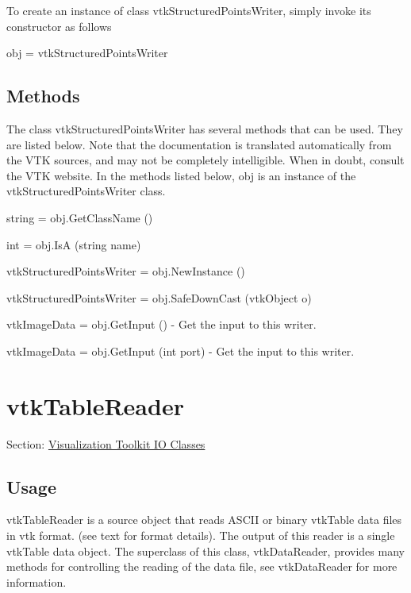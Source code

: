 To create an instance of class vtk\-Structured\-Points\-Writer, simply invoke its constructor as follows \begin{DoxyVerb}  obj = vtkStructuredPointsWriter
\end{DoxyVerb}
 \hypertarget{vtkwidgets_vtkxyplotwidget_Methods}{}\subsection{Methods}\label{vtkwidgets_vtkxyplotwidget_Methods}
The class vtk\-Structured\-Points\-Writer has several methods that can be used. They are listed below. Note that the documentation is translated automatically from the V\-T\-K sources, and may not be completely intelligible. When in doubt, consult the V\-T\-K website. In the methods listed below, {\ttfamily obj} is an instance of the vtk\-Structured\-Points\-Writer class. 
\begin{DoxyItemize}
\item {\ttfamily string = obj.\-Get\-Class\-Name ()}  
\item {\ttfamily int = obj.\-Is\-A (string name)}  
\item {\ttfamily vtk\-Structured\-Points\-Writer = obj.\-New\-Instance ()}  
\item {\ttfamily vtk\-Structured\-Points\-Writer = obj.\-Safe\-Down\-Cast (vtk\-Object o)}  
\item {\ttfamily vtk\-Image\-Data = obj.\-Get\-Input ()} -\/ Get the input to this writer.  
\item {\ttfamily vtk\-Image\-Data = obj.\-Get\-Input (int port)} -\/ Get the input to this writer.  
\end{DoxyItemize}\hypertarget{vtkio_vtktablereader}{}\section{vtk\-Table\-Reader}\label{vtkio_vtktablereader}
Section\-: \hyperlink{sec_vtkio}{Visualization Toolkit I\-O Classes} \hypertarget{vtkwidgets_vtkxyplotwidget_Usage}{}\subsection{Usage}\label{vtkwidgets_vtkxyplotwidget_Usage}
vtk\-Table\-Reader is a source object that reads A\-S\-C\-I\-I or binary vtk\-Table data files in vtk format. (see text for format details). The output of this reader is a single vtk\-Table data object. The superclass of this class, vtk\-Data\-Reader, provides many methods for controlling the reading of the data file, see vtk\-Data\-Reader for more information.

